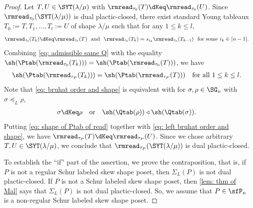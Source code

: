 \documentclass[12pt, reqno]{amsart}
\theoremstyle{definition}
\numberwithin{equation}{section} \numberwithin{figure}{section}
\numberwithin{table}{section}
\begin{document}
\begin{proof}
Let $T, U \in \SYT(\lambda/\mu)$ with $\rmread_{\tau_0}(T) \dKeq \rmread_{\tau_0}(U)$.
Since $\rmread_{\tau_0}(\SYT(\lambda/\mu))$ is dual plactic-closed, there exist standard Young tableaux $T_0 := T, T_1, \ldots, T_l := U$ of shape $\lambda/\mu$ 
such that for any $1 \leq k \leq l$, 
\begin{align*}
\rmread_{\tau_0}(T_k) \dKeq\rmread_{\tau_0}(T) 
\ \  \text{and} \ \ 
\rmread_{\tau_0}(T_k) = s_{i_k} \rmread_{\tau_0}(T_{k-1}) \ \  \text{for some $i_k \in [n-1]$}. 
\end{align*}
Combining \cref{eq: admissible same Q} with the equality $\sh(\Ptab(\rmread_{\tau_0}(T_k))) = \sh(\Ptab(\rmread_{\tau_0}(T)))$, we have
\begin{align}\label{eq: shape of Ptab of read}
\sh(\Ptab(\rmread_{\tau_P}(T_k))) = \sh(\Ptab(\rmread_{\tau_P}(T)))
\quad \text{for all $1 \le k \le l$.}
\end{align}
Note that \cref{eq: bruhat order and shape} is equivalent with 
for $\sigma, \rho \in \SG_n$ with $\sigma \preceq_L \rho$,
\begin{align}\label{eq: left bruhat order and shape}
\sigma \dKeq \rho
\quad \text{or} \quad
\sh(\Qtab(\rho)) \triangleleft \sh(\Qtab(\sigma)).
\end{align}
Putting \cref{eq: shape of Ptab of read} together with \cref{eq: left bruhat order and shape}, we have 
$\rmread_{\tau_P}(T) \dKeq \rmread_{\tau_P}(U)$.
Since we chose arbitrary $T,U \in \SYT(\lambda/\mu)$, we conclude that $\rmread_{\tau_P}(\SYT(\lambda/\mu))$ is dual plactic-closed.





To establish the ``if'' part of the assertion, we prove the contraposition,
that is, if $P$ is not a regular Schur labeled skew shape poset, then $\Sigma_L(P)$ is not dual plactic-closed.
If $P$ is not a Schur labeled skew shape poset, then \cref{lem: thm of Mal} says that $\Sigma_L(P)$ is not dual plactic-closed.
So, we assume that $P \in \sfP_n$ is a non-regular Schur labeled skew shape poset.




\end{proof}
\end{document}
